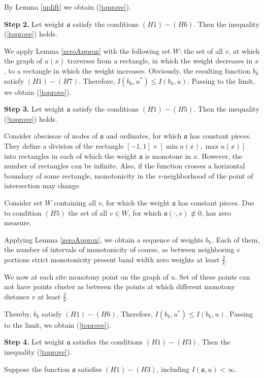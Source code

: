 By Lemma \ref{uplift} we obtain (\ref{toprove}).

\bigskip

{\bf Step 2.} Let weight $\mathfrak a$ satisfy the conditions $(H1)-(H6)$.
Then the inequality (\ref{toprove}) holds.

We apply Lemma \ref{zeroApprox} with the following set $W$:
the set of all $v$, at which the graph of $u(x)$ traverses from a rectangle,
in which the weight decreases in $x$,
to a rectangle in which the weight increases.
Obviously, the resulting function $b_k$ satisfy $(H1)-(H7)$.
Therefore, $I(b_k, u^*) \le I(b_k, u)$.
Passing to the limit, we obtain (\ref{toprove}).

\bigskip

{\bf Step 3.} Let weight $\mathfrak a$ satisfy the conditions $(H1)-(H5)$.
Then the inequality (\ref{toprove}) holds.

Consider abscissae of nodes of $\mathfrak a$
and ordinates, for which $\mathfrak a$ has constant pieces.
They define a division of the rectangle $[-1, 1] \times [\min u(x), \max u(x)]$
into rectangles in each of which the weight $\mathfrak a$ is monotone in $x$.
However, the number of rectangles can be infinite.
Also, if the function crosses a horizontal boundary of some rectangle,
monotonicity in the $v$-neighborhood of the point of intersection may change.

Consider set $W$ containing all $v$, for which the weight $\mathfrak a$ has constant pieces.
Due to condition $(H5)$ the set of all $v \in W$, for which $\mathfrak a(\cdot, v) \not\equiv 0$,
has zero measure.

Applying Lemma \ref{zeroApprox}, we obtain a sequence of weights $b_k$.
Each of them, the number of intervals of monotonicity of course,
as between neighboring $v$ portions strict monotonicity
present band width zero weights at least $\frac{2}{k}$.

We now at each site monotony point on the graph of $u$.
Set of these points can not have points cluster
as between the points at which different monotony
distance $v$ at least $\frac{2}{k}$.

Thereby, $b_k$ satisfy $(H1)-(H6)$. Therefore, $I(b_k, u^*) \le I(b_k, u)$.
Passing to the limit, we obtain (\ref{toprove}).

\bigskip
{\bf Step 4.} Let weight $\mathfrak a$ satisfies the conditions $(H1)-(H3)$.
Then the inequality (\ref{toprove}).

Suppose the function $\mathfrak a$ satisfies $(H1)-(H3)$, including $I(\mathfrak a, u) < \infty$.


